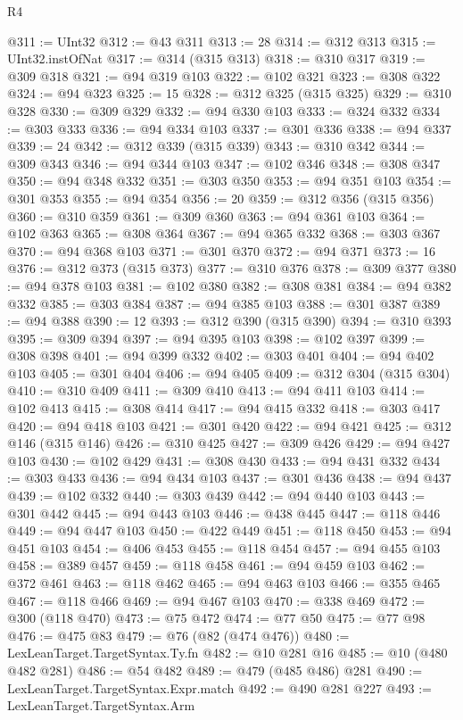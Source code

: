 \begin{lexlean}{R4}
\begin{coremodule}
@311 := UInt32
@312 := @43 @311
@313 := 28
@314 := @312 @313
@315 := UInt32.instOfNat
@317 := @314 (@315 @313)
@318 := @310 @317
@319 := @309 @318
@321 := @94 @319 @103
@322 := @102 @321
@323 := @308 @322
@324 := @94 @323
@325 := 15
@328 := @312 @325 (@315 @325)
@329 := @310 @328
@330 := @309 @329
@332 := @94 @330 @103
@333 := @324 @332
@334 := @303 @333
@336 := @94 @334 @103
@337 := @301 @336
@338 := @94 @337
@339 := 24
@342 := @312 @339 (@315 @339)
@343 := @310 @342
@344 := @309 @343
@346 := @94 @344 @103
@347 := @102 @346
@348 := @308 @347
@350 := @94 @348 @332
@351 := @303 @350
@353 := @94 @351 @103
@354 := @301 @353
@355 := @94 @354
@356 := 20
@359 := @312 @356 (@315 @356)
@360 := @310 @359
@361 := @309 @360
@363 := @94 @361 @103
@364 := @102 @363
@365 := @308 @364
@367 := @94 @365 @332
@368 := @303 @367
@370 := @94 @368 @103
@371 := @301 @370
@372 := @94 @371
@373 := 16
@376 := @312 @373 (@315 @373)
@377 := @310 @376
@378 := @309 @377
@380 := @94 @378 @103
@381 := @102 @380
@382 := @308 @381
@384 := @94 @382 @332
@385 := @303 @384
@387 := @94 @385 @103
@388 := @301 @387
@389 := @94 @388
@390 := 12
@393 := @312 @390 (@315 @390)
@394 := @310 @393
@395 := @309 @394
@397 := @94 @395 @103
@398 := @102 @397
@399 := @308 @398
@401 := @94 @399 @332
@402 := @303 @401
@404 := @94 @402 @103
@405 := @301 @404
@406 := @94 @405
@409 := @312 @304 (@315 @304)
@410 := @310 @409
@411 := @309 @410
@413 := @94 @411 @103
@414 := @102 @413
@415 := @308 @414
@417 := @94 @415 @332
@418 := @303 @417
@420 := @94 @418 @103
@421 := @301 @420
@422 := @94 @421
@425 := @312 @146 (@315 @146)
@426 := @310 @425
@427 := @309 @426
@429 := @94 @427 @103
@430 := @102 @429
@431 := @308 @430
@433 := @94 @431 @332
@434 := @303 @433
@436 := @94 @434 @103
@437 := @301 @436
@438 := @94 @437
@439 := @102 @332
@440 := @303 @439
@442 := @94 @440 @103
@443 := @301 @442
@445 := @94 @443 @103
@446 := @438 @445
@447 := @118 @446
@449 := @94 @447 @103
@450 := @422 @449
@451 := @118 @450
@453 := @94 @451 @103
@454 := @406 @453
@455 := @118 @454
@457 := @94 @455 @103
@458 := @389 @457
@459 := @118 @458
@461 := @94 @459 @103
@462 := @372 @461
@463 := @118 @462
@465 := @94 @463 @103
@466 := @355 @465
@467 := @118 @466
@469 := @94 @467 @103
@470 := @338 @469
@472 := @300 (@118 @470)
@473 := @75 @472
@474 := @77 @50
@475 := @77 @98
@476 := @475 @83
@479 := @76 (@82 (@474 @476))
@480 := LexLeanTarget.TargetSyntax.Ty.fn
@482 := @10 @281 @16
@485 := @10 (@480 @482 @281)
@486 := @54 @482
@489 := @479 (@485 @486) @281
@490 := LexLeanTarget.TargetSyntax.Expr.match
@492 := @490 @281 @227
@493 := LexLeanTarget.TargetSyntax.Arm

\end{coremodule}
\end{lexlean}

